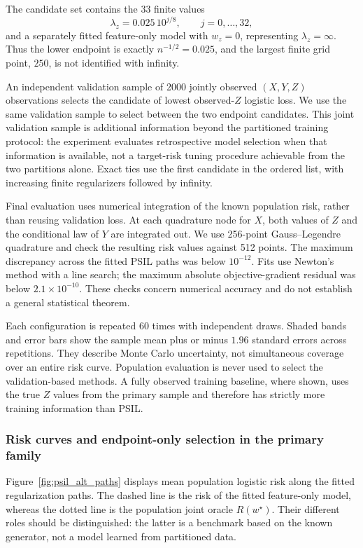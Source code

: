 The candidate set contains the 33 finite values
\[
\lambda_z=0.025\,10^{j/8},\qquad j=0,\ldots,32,
\]
and a separately fitted feature-only model with $w_z=0$, representing $\lambda_z=\infty$. Thus the lower endpoint is exactly $n^{-1/2}=0.025$, and the largest finite grid point, $250$, is not identified with infinity.

An independent validation sample of 2000 jointly observed $(X,Y,Z)$ observations selects the candidate of lowest observed-$Z$ logistic loss. We use the same validation sample to select between the two endpoint candidates. This joint validation sample is additional information beyond the partitioned training protocol: the experiment evaluates retrospective model selection when that information is available, not a target-risk tuning procedure achievable from the two partitions alone. Exact ties use the first candidate in the ordered list, with increasing finite regularizers followed by infinity.

Final evaluation uses numerical integration of the known population risk, rather than reusing validation loss. At each quadrature node for $X$, both values of $Z$ and the conditional law of $Y$ are integrated out. We use 256-point Gauss--Legendre quadrature and check the resulting risk values against 512 points. The maximum discrepancy across the fitted PSIL paths was below $10^{-12}$. Fits use Newton's method with a line search; the maximum absolute objective-gradient residual was below $2.1\times10^{-10}$. These checks concern numerical accuracy and do not establish a general statistical theorem.

Each configuration is repeated 60 times with independent draws. Shaded bands and error bars show the sample mean plus or minus $1.96$ standard errors across repetitions. They describe Monte Carlo uncertainty, not simultaneous coverage over an entire risk curve. Population evaluation is never used to select the validation-based methods. A fully observed training baseline, where shown, uses the true $Z$ values from the primary sample and therefore has strictly more training information than PSIL.

\subsubsection{Risk curves and endpoint-only selection in the primary family}

Figure~\ref{fig:psil_alt_paths} displays mean population logistic risk along the fitted regularization paths. The dashed line is the risk of the fitted feature-only model, whereas the dotted line is the population joint oracle $R(w^\star)$. Their different roles should be distinguished: the latter is a benchmark based on the known generator, not a model learned from partitioned data.

